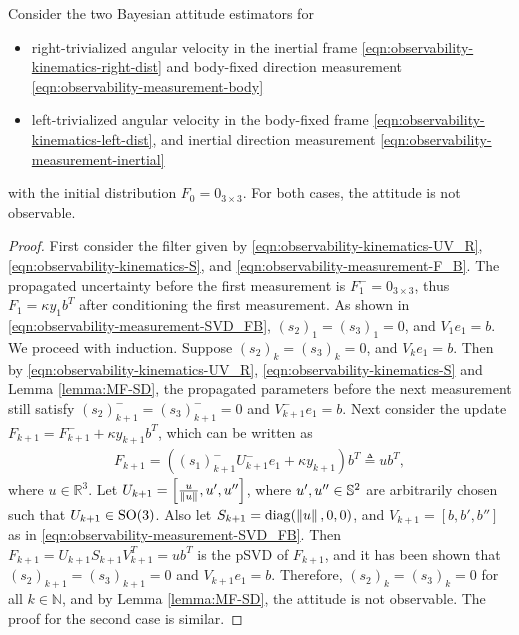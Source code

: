 \begin{theorem} \label{thm:observability-nonobs}
	Consider the two Bayesian attitude estimators for
	\begin{itemize}
		\item right-trivialized angular velocity in the inertial frame  \eqref{eqn:observability-kinematics-right-dist} and body-fixed direction measurement \eqref{eqn:observability-measurement-body}  
		\item left-trivialized angular velocity in the body-fixed frame \eqref{eqn:observability-kinematics-left-dist}, and inertial direction measurement \eqref{eqn:observability-measurement-inertial} 
	\end{itemize}
	with the initial distribution $F_0=0_{3\times 3}$.
	For both cases, the attitude is not observable.
\end{theorem}
\begin{proof}
	First consider the filter given by \eqref{eqn:observability-kinematics-UV_R}, \eqref{eqn:observability-kinematics-S}, and \eqref{eqn:observability-measurement-F_B}.
	The propagated uncertainty before the first measurement is $F_1^- = 0_{3\times 3}$, thus $F_1 = \kappa y_1b^T$ after conditioning the first measurement.
	As shown in \eqref{eqn:observability-measurement-SVD_FB}, $(s_2)_1=(s_3)_1=0$, and $V_1e_1 = b$.
	We proceed with induction.
	Suppose $(s_2)_k=(s_3)_k=0$, and $V_ke_1 = b$.
	Then by \eqref{eqn:observability-kinematics-UV_R}, \eqref{eqn:observability-kinematics-S} and Lemma \ref{lemma:MF-SD}, the propagated parameters before the next measurement still satisfy $(s_2)_{k+1}^-=(s_3)_{k+1}^- = 0$ and $V_{k+1}^-e_1=b$.
	Next consider the update $F_{k+1} = F_{k+1}^-+\kappa y_{k+1}b^T$, which can be written as
	\begin{align*}
		F_{k+1} = \left((s_1)_{k+1}^-U_{k+1}^-e_1 + \kappa y_{k+1}\right)b^T \triangleq ub^T,
	\end{align*}
	where $u\in\mathbb{R}^3$.
	Let $U_{k+1} = \Big[ \frac{u}{\left\| u \right\|}, u', u'' \Big]$, where $u',u''\in\mathbb{S}^2$ are arbitrarily chosen such that $U_{k+1}\in\mathrm{SO}(3)$.
	Also let $S_{k+1} = \mathrm{diag}(\left\| u \right\|,0,0)$, and $V_{k+1} = [ b, b', b'' ]$ as in \eqref{eqn:observability-measurement-SVD_FB}.
	Then $F_{k+1} = U_{k+1}S_{k+1}V_{k+1}^T = ub^T $ is the pSVD of $F_{k+1}$, and it has been shown that $(s_2)_{k+1}=(s_3)_{k+1}=0$ and $V_{k+1}e_1=b$.
	Therefore, $(s_2)_k=(s_3)_k=0$ for all $k\in\mathbb{N}$, and by Lemma \ref{lemma:MF-SD}, the attitude is not observable.
	The proof for the second case is similar.
\end{proof}

